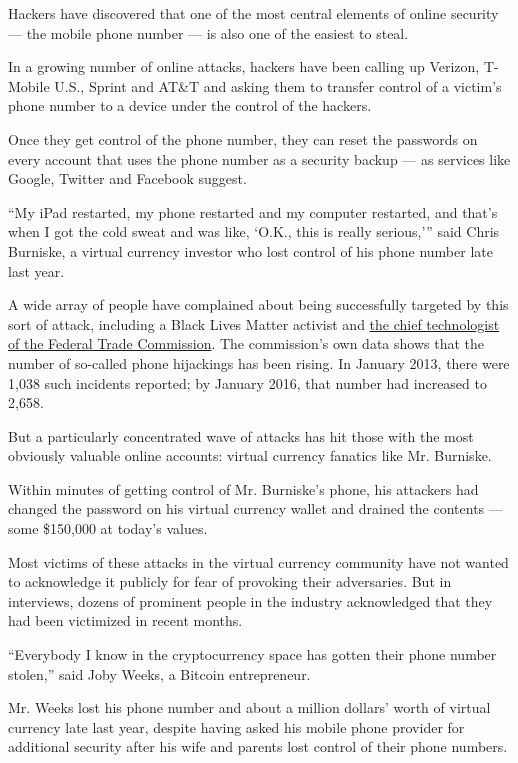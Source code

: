 Hackers have discovered that one of the most central elements of online
security --- the mobile phone number --- is also one of the easiest to
steal.

In a growing number of online attacks, hackers have been calling up
Verizon, T-Mobile U.S., Sprint and AT\&T and asking them to transfer
control of a victim's phone number to a device under the control of the
hackers.

Once they get control of the phone number, they can reset the passwords
on every account that uses the phone number as a security backup --- as
services like Google, Twitter and Facebook suggest.

``My iPad restarted, my phone restarted and my computer restarted, and
that's when I got the cold sweat and was like, `O.K., this is really
serious,''' said Chris Burniske, a virtual currency investor who lost
control of his phone number late last year.

A wide array of people have complained about being successfully targeted
by this sort of attack, including a Black Lives Matter activist and
\href{https://www.ftc.gov/news-events/blogs/techftc/2016/06/your-mobile-phone-account-could-be-hijacked-identity-thief\#othervictims}{the
chief technologist of the Federal Trade Commission}. The commission's
own data shows that the number of so-called phone hijackings has been
rising. In January 2013, there were 1,038 such incidents reported; by
January 2016, that number had increased to 2,658.

But a particularly concentrated wave of attacks has hit those with the
most obviously valuable online accounts: virtual currency fanatics like
Mr. Burniske.

Within minutes of getting control of Mr. Burniske's phone, his attackers
had changed the password on his virtual currency wallet and drained the
contents --- some \$150,000 at today's values.

Most victims of these attacks in the virtual currency community have not
wanted to acknowledge it publicly for fear of provoking their
adversaries. But in interviews, dozens of prominent people in the
industry acknowledged that they had been victimized in recent months.

``Everybody I know in the cryptocurrency space has gotten their phone
number stolen,'' said Joby Weeks, a Bitcoin entrepreneur.

Mr. Weeks lost his phone number and about a million dollars' worth of
virtual currency late last year, despite having asked his mobile phone
provider for additional security after his wife and parents lost control
of their phone numbers.

